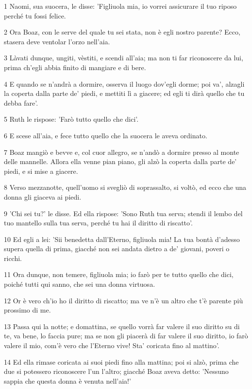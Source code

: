 \par 1 Naomi, sua suocera, le disse: 'Figliuola mia, io vorrei assicurare il tuo riposo perché tu fossi felice.
\par 2 Ora Boaz, con le serve del quale tu sei stata, non è egli nostro parente? Ecco, stasera deve ventolar l'orzo nell'aia.
\par 3 Làvati dunque, ungiti, vèstiti, e scendi all'aia; ma non ti far riconoscere da lui, prima ch'egli abbia finito di mangiare e di bere.
\par 4 E quando se n'andrà a dormire, osserva il luogo dov'egli dorme; poi va', alzagli la coperta dalla parte de' piedi, e mettiti lì a giacere; ed egli ti dirà quello che tu debba fare'.
\par 5 Ruth le rispose: 'Farò tutto quello che dici'.
\par 6 E scese all'aia, e fece tutto quello che la suocera le aveva ordinato.
\par 7 Boaz mangiò e bevve e, col cuor allegro, se n'andò a dormire presso al monte delle mannelle. Allora ella venne pian piano, gli alzò la coperta dalla parte de' piedi, e si mise a giacere.
\par 8 Verso mezzanotte, quell'uomo si svegliò di soprassalto, si voltò, ed ecco che una donna gli giaceva ai piedi.
\par 9 'Chi sei tu?' le disse. Ed ella rispose: 'Sono Ruth tua serva; stendi il lembo del tuo mantello sulla tua serva, perché tu hai il diritto di riscatto'.
\par 10 Ed egli a lei: 'Sii benedetta dall'Eterno, figliuola mia! La tua bontà d'adesso supera quella di prima, giacché non sei andata dietro a de' giovani, poveri o ricchi.
\par 11 Ora dunque, non temere, figliuola mia; io farò per te tutto quello che dici, poiché tutti qui sanno, che sei una donna virtuosa.
\par 12 Or è vero ch'io ho il diritto di riscatto; ma ve n'è un altro che t'è parente più prossimo di me.
\par 13 Passa qui la notte; e domattina, se quello vorrà far valere il suo diritto su di te, va bene, lo faccia pure; ma se non gli piacerà di far valere il suo diritto, io farò valere il mio, com'è vero che l'Eterno vive! Sta' coricata fino al mattino'.
\par 14 Ed ella rimase coricata ai suoi piedi fino alla mattina; poi si alzò, prima che due si potessero riconoscere l'un l'altro; giacché Boaz aveva detto: 'Nessuno sappia che questa donna è venuta nell'aia!'
